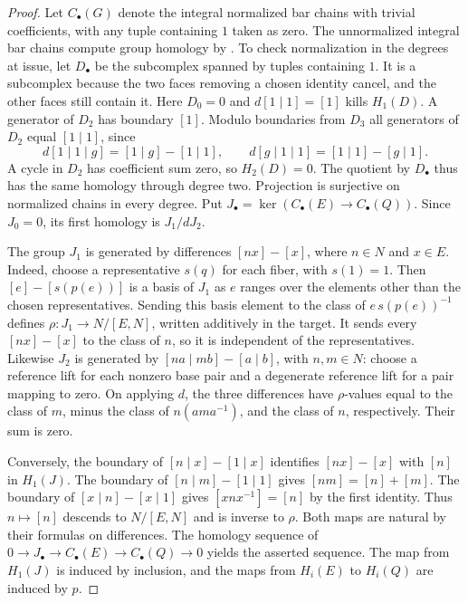 \documentclass[11pt,oneside,openany]{book}
\theoremstyle{definition}
\theoremstyle{remark}
\begin{document}
\begin{proof}
Let \(C_\bullet(G)\) denote the integral normalized bar chains
with trivial coefficients, with any tuple containing \(1\) taken
as zero. The unnormalized integral bar chains compute group homology
by \cite[A10]{homalg}. To check normalization in the degrees at issue,
let \(D_\bullet\) be the subcomplex spanned by tuples containing \(1\).
It is a subcomplex because the two faces removing a chosen identity
cancel, and the other faces still contain it. Here \(D_0=0\) and
\(d[1\mid1]=[1]\) kills \(H_1(D)\). A generator of \(D_2\) has
boundary \([1]\). Modulo boundaries from \(D_3\) all generators of
\(D_2\) equal \([1\mid1]\), since
\[
 d[1\mid1\mid g]=[1\mid g]-[1\mid1],
 \qquad
 d[g\mid1\mid1]=[1\mid1]-[g\mid1].
\]
A cycle in \(D_2\) has coefficient sum zero, so \(H_2(D)=0\).
The quotient by \(D_\bullet\) thus has the same homology through
degree two. Projection is surjective on normalized chains in every degree. Put
\(J_\bullet=\ker(C_\bullet(E)\to C_\bullet(Q))\). Since \(J_0=0\),
its first homology is \(J_1/dJ_2\).

The group \(J_1\) is generated by differences \([nx]-[x]\), where
\(n\in N\) and \(x\in E\). Indeed, choose a representative \(s(q)\)
for each fiber, with \(s(1)=1\). Then \([e]-[s(p(e))]\) is a basis
of \(J_1\) as \(e\) ranges over the elements other than the chosen
representatives. Sending this basis element to the class of
\(e\,s(p(e))^{-1}\) defines \(\rho:J_1\to N/[E,N]\), written
additively in the target. It sends every \([nx]-[x]\) to the class
of \(n\), so it is independent of the representatives. Likewise
\(J_2\) is generated by \([na\mid mb]-[a\mid b]\), with \(n,m\in N\):
choose a reference lift for each nonzero base pair and a degenerate
reference lift for a pair mapping to zero. On applying \(d\), the
three differences have \(\rho\)-values equal to the class of \(m\),
minus the class of \(n(ama^{-1})\), and the class of \(n\),
respectively. Their sum is zero.

Conversely, the boundary of \([n\mid x]-[1\mid x]\) identifies
\([nx]-[x]\) with \([n]\) in \(H_1(J)\). The boundary of
\([n\mid m]-[1\mid1]\) gives \([nm]=[n]+[m]\). The boundary of
\([x\mid n]-[x\mid1]\) gives \([xnx^{-1}]=[n]\) by the first identity.
Thus \(n\mapsto[n]\) descends to \(N/[E,N]\) and is inverse to
\(\rho\). Both maps are natural by their formulas on differences.
The homology sequence of
\(0\to J_\bullet\to C_\bullet(E)\to C_\bullet(Q)\to0\) yields the
asserted sequence. The map from \(H_1(J)\) is induced by inclusion,
and the maps from \(H_i(E)\) to \(H_i(Q)\) are induced by \(p\).


\end{proof}
\end{document}
